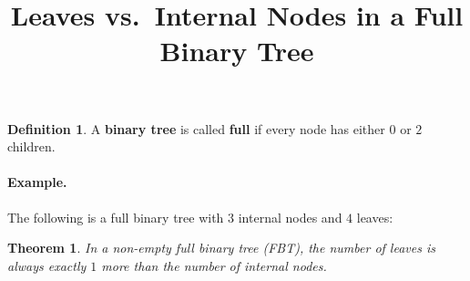 \documentclass[12pt]{article}
\title{\textbf{Leaves vs.\ Internal Nodes in a Full Binary Tree}}
\author{}
\date{}
\theoremstyle{definition}
\newtheorem{definition}{Definition}
\theoremstyle{plain}
\newtheorem{theorem}{Theorem}
\begin{document}
\maketitle

\begin{definition}
A \textbf{binary tree} is called \textbf{full} if every node has either $0$ or $2$ children.
\end{definition}

\paragraph{Example.}
The following is a full binary tree with $3$ internal nodes and $4$ leaves:

\begin{center}
\end{center}

\begin{theorem}
In a non-empty full binary tree (FBT), the number of leaves is always exactly $1$ more than
the number of internal nodes.
\end{theorem}
\end{document}

